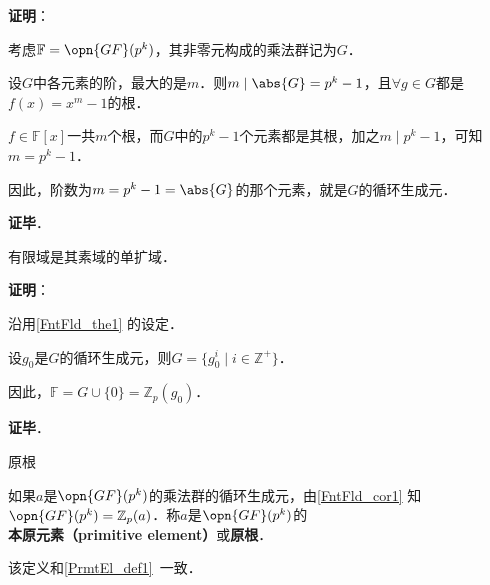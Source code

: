 \textbf{证明}：

考虑$\mathbb{F}=\opn{GF}(p^k)$，其非零元构成的乘法群记为$G$．

设$G$中各元素的阶，最大的是$m$．则$m\mid \abs{G} = p^k-1$，且$\forall g\in G$都是$f(x)=x^m-1$的根．

$f\in\mathbb{F}[x]$一共$m$个根，而$G$中的$p^k-1$个元素都是其根，加之$m\mid p^k-1$，可知$m=p^k-1$．

因此，阶数为$m=p^k-1=\abs{G}$的那个元素，就是$G$的循环生成元．

\textbf{证毕}．



\begin{corollary}{}\label{FntFld_cor1}
有限域是其素域的单扩域．
\end{corollary}

\textbf{证明}：

沿用\autoref{FntFld_the1} 的设定．

设$g_0$是$G$的循环生成元，则$G=\{g_0^i\mid i\in\mathbb{Z}^+\}$．

因此，$\mathbb{F}=G\cup\{0\}=\mathbb{Z}_p(g_0)$．

\textbf{证毕}．

\begin{definition}{原根}

如果$a$是$\opn{GF}(p^k)$的乘法群的循环生成元，由\autoref{FntFld_cor1} 知$\opn{GF}(p^k)=\mathbb{Z}_p(a)$．称$a$是$\opn{GF}(p^k)$的\textbf{本原元素（primitive element）}或\textbf{原根}．

该定义和\autoref{PrmtEl_def1}~一致．

\end{definition}

